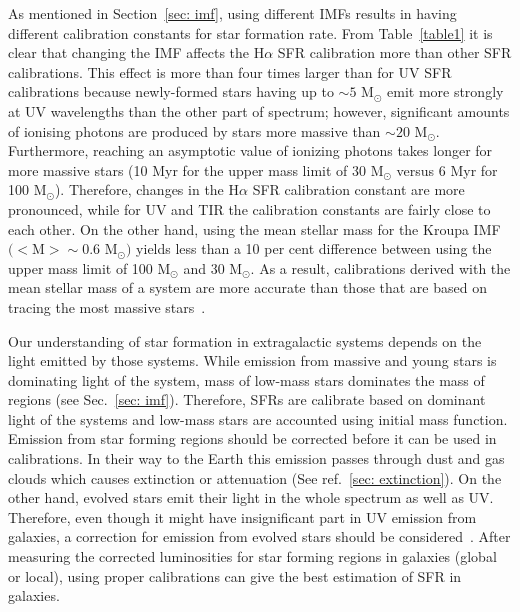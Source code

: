 As mentioned in Section~\ref{sec: imf}, using different IMFs results in having different calibration constants for star formation rate. 
From Table~\ref{table1} it is clear that changing the IMF affects the H${\alpha}$ SFR calibration more than other SFR calibrations. 
This effect is more than four times larger than for UV SFR calibrations because newly-formed stars having up to $\sim 5$ M$_{\odot}$ emit more strongly at UV wavelengths than the other part of spectrum; however, significant amounts of ionising photons are produced by stars more massive than $\sim 20$ M$_{\odot}$.
Furthermore, reaching an asymptotic value of ionizing photons takes longer for more massive stars (10 Myr for the upper mass limit of 30 M$_{\odot}$ versus 6 Myr for 100 M$_{\odot}$). 
Therefore, changes in the H${\alpha}$ SFR calibration constant are more pronounced, while for UV and TIR the calibration constants are fairly close to each other.
On the other hand, using the mean stellar mass for the Kroupa IMF $(<$M$> \sim 0.6$ M$_{\odot})$ yields less than a 10 per cent difference between using the upper mass limit of 100 M$_{\odot}$ and 30 M$_{\odot}$. 
As a result, calibrations derived with the mean stellar mass of a system are more accurate than those that are based on tracing the most massive stars~\citep{Calzetti13}.

Our understanding of star formation in extragalactic systems depends on the light emitted by those systems.
While emission from massive and young stars is dominating light of the system, mass of low-mass stars dominates the mass of regions (see Sec.~\ref{sec: imf}).
Therefore, SFRs are calibrate based on dominant light of the systems and low-mass stars are accounted using initial mass function.
Emission from star forming regions should be corrected before it can be used in calibrations.
In their way to the Earth this emission passes through dust and gas clouds which causes extinction or attenuation (See ref.~\ref{sec: extinction}).
On the other hand, evolved stars emit their light in the whole spectrum as well as UV. 
Therefore, even though it might have insignificant part in UV emission from galaxies, a correction for emission from evolved stars should be considered~\citep{Leroy08}.
After measuring the corrected luminosities for star forming regions in galaxies (global or local), using proper calibrations can give the best estimation of SFR in galaxies. 




